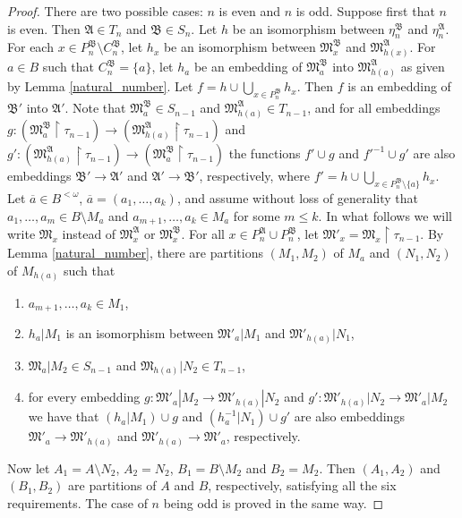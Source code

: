 \documentclass{ndjflart}
\theoremstyle{plain}
\theoremstyle{definition}
\numberwithin{equation}{section}
\begin{document}
\begin{proof}
There are two possible cases: $n$ is even and $n$ is odd.
Suppose first that $n$ is even.
Then $\mathfrak{A} \in T_n$ and $\mathfrak{B} \in S_n$.
Let $h$ be an isomorphism between $\eta^{\mathfrak{B}}_n$ and $\eta^{\mathfrak{A}}_n$.
For each $x\in P_n^{\mathfrak{B}} \setminus C_n^{\mathfrak{B}}$, let $h_x$ be an isomorphism between $\mathfrak{M}^{\mathfrak{B}}_x$ and $\mathfrak{M}^{\mathfrak{A}}_{h(x)}$. For $a \in B$ such that $C^{\mathfrak{B}}_n = \{a\}$, let $h_a$ be an embedding of $\mathfrak{M}^{\mathfrak{B}}_a$ into $\mathfrak{M}^{\mathfrak{A}}_{h(a)}$ as given by Lemma \ref{natural_number}.
Let $f = h \cup \bigcup_{x\in P^{\mathfrak{B}}_n}h_x$. Then $f$ is an embedding of $\mathfrak{B}'$ into $\mathfrak{A}'$.
Note that $\mathfrak{M}^{\mathfrak{B}}_a \in S_{n-1}$ and $\mathfrak{M}^{\mathfrak{A}}_{h(a)} \in T_{n-1}$, and for all embeddings $g \colon  (\mathfrak{M}^{\mathfrak{B}}_a \upharpoonright \tau_{n-1}) \rightarrow (\mathfrak{M}^{\mathfrak{A}}_{h(a)} \upharpoonright \tau_{n-1})$ and 
$g' \colon (\mathfrak{M}^{\mathfrak{A}}_{h(a)} \upharpoonright \tau_{n-1}) \rightarrow (\mathfrak{M}^{\mathfrak{B}}_a \upharpoonright \tau_{n-1})$ the functions $f' \cup g$ and $f'^{-1} \cup g'$ are also embeddings $\mathfrak{B}' \rightarrow \mathfrak{A}'$ and $\mathfrak{A}' \rightarrow \mathfrak{B}'$, respectively, where $f' = h\cup \bigcup_{x\in P_n^{\mathfrak{B}}\setminus \{a\}} h_x$.
Let $\overline{a} \in B^{<\omega}$, $\overline{a} = (a_1,\dots,a_k)$, and assume without loss of generality that $a_1,\dots,a_m \in B\setminus M_a$ and $a_{m+1},\dots,a_k \in M_a$ for some $m\leq k$.
In what follows we will write $\mathfrak{M}_x$ instead of $\mathfrak{M}_x^{\mathfrak{A}}$ or $\mathfrak{M}_x^{\mathfrak{B}}$.
For all $x \in P^{\mathfrak{A}}_n \cup P^{\mathfrak{B}}_n$, let $\mathfrak{M}'_x = \mathfrak{M}_x\upharpoonright \tau_{n-1}$.
By Lemma \ref{natural_number}, there are partitions $(M_1,M_2)$ of $M_a$ and $(N_1,N_2)$ of $M_{h(a)}$ such that
\begin{enumerate}
\item $a_{m+1},\dots,a_k \in M_1$,
\item $h_a|M_1$ is an isomorphism between $\mathfrak{M}'_a | M_1$ and $\mathfrak{M}'_{h(a)} | N_1$,
\item $\mathfrak{M}_a | M_2 \in S_{n-1}$ and $\mathfrak{M}_{h(a)} | N_2 \in T_{n-1}$,
\item for every embedding $g \colon \mathfrak{M}'_a|M_2 \rightarrow \mathfrak{M}'_{h(a)}|N_2$ and $g' \colon \mathfrak{M}'_{h(a)}|N_2 \rightarrow \mathfrak{M}'_a | M_2$ we have that 
$(h_a | M_1) \cup g$ and $(h_a^{-1} | N_1)\cup g'$ are also embeddings $\mathfrak{M}'_a \rightarrow \mathfrak{M}'_{h(a)}$ and $\mathfrak{M}'_{h(a)} \rightarrow \mathfrak{M}'_a$, respectively.
\end{enumerate}
Now let $A_1 = A \setminus N_2$, $A_2 = N_2$, $B_1 = B \setminus M_2$ and $B_2 = M_2$.
Then $(A_1,A_2)$ and $(B_1,B_2)$ are partitions of $A$ and $B$, respectively, satisfying all the six requirements.
The case of $n$ being odd is proved in the same way.
\end{proof}
\end{document}
